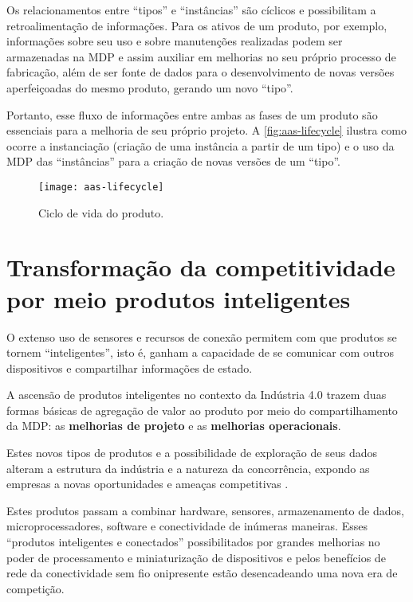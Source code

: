 	Os relacionamentos entre ``tipos'' e ``instâncias'' são cíclicos e possibilitam a retroalimentação de informações. Para os ativos de um produto, por exemplo, informações sobre seu uso e sobre manutenções realizadas podem ser armazenadas na MDP e assim auxiliar em melhorias no seu próprio processo de fabricação, além de ser fonte de dados para o desenvolvimento de novas versões aperfeiçoadas do mesmo produto, gerando um novo ``tipo''.
	
	Portanto, esse fluxo de informações entre ambas as fases de um produto são essenciais para a melhoria de seu próprio projeto. A \autoref{fig:aas-lifecycle} ilustra como ocorre a instanciação (criação de uma instância a partir de um tipo) e o uso da MDP das ``instâncias'' para a criação de novas versões de um ``tipo''.
	
	\begin{figure}[htb!]
		\centering
		\caption{Ciclo de vida do produto.}
		\label{fig:aas-lifecycle}
		\texttt{[image: aas-lifecycle]}
	\end{figure}

\section{Transformação da competitividade por meio produtos inteligentes}

	O extenso uso de sensores e recursos de conexão permitem com que produtos se tornem ``inteligentes'', isto é, ganham a capacidade de se comunicar com outros dispositivos e compartilhar informações de estado.
	
	A ascensão de produtos inteligentes no contexto da Indústria 4.0 trazem duas formas básicas de agregação de valor ao produto por meio do compartilhamento da MDP: as \textbf{melhorias de projeto} e as \textbf{melhorias operacionais}.
	
	Estes novos tipos de produtos e a possibilidade de exploração de seus dados alteram a estrutura da indústria e a natureza da concorrência, expondo as empresas a novas oportunidades e ameaças competitivas \cite{porter2014smartproducts}.
	
	Estes produtos passam a combinar hardware, sensores, armazenamento de dados, microprocessadores, software e conectividade de inúmeras maneiras. Esses “produtos inteligentes e conectados” possibilitados por grandes melhorias no poder de processamento e miniaturização de dispositivos e pelos benefícios de rede da conectividade sem fio onipresente estão desencadeando uma nova era de competição.
	
